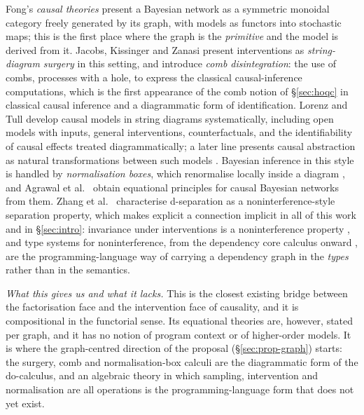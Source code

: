 Fong's \emph{causal theories} \cite{fong2012causaltheories} present a Bayesian network as a symmetric monoidal category freely generated by its graph, with models as functors into stochastic maps; this is the first place where the graph is the \emph{primitive} and the model is derived from it. Jacobs, Kissinger and Zanasi \cite{jacobs2019causal} present interventions as \emph{string-diagram surgery} in this setting, and introduce \emph{comb disintegration}: the use of combs, processes with a hole, to express the classical causal-inference computations, which is the first appearance of the comb notion of \S\ref{sec:hoqc} in classical causal inference and a diagrammatic form of identification. Lorenz and Tull \cite{lorenz2023causalmodelsstringdiagrams} develop causal models in string diagrams systematically, including open models with inputs, general interventions, counterfactuals, and the identifiability of causal effects treated diagrammatically; a later line presents causal abstraction as natural transformations between such models \cite{lorenztull2026abstraction,englberger2025causalabstractionscategoricallyunified}. Bayesian inference in this style is handled by \emph{normalisation boxes}, which renormalise locally inside a diagram \cite{jacobsszelesstein2025inference}, and Agrawal et al.\ \cite{agrawal2026equational} obtain equational principles for causal Bayesian networks from them. Zhang et al.\ \cite{zhang2026semanticseparation} characterise d-separation as a noninterference-style separation property, which makes explicit a connection implicit in all of this work and in \S\ref{sec:intro}: invariance under interventions is a noninterference property \cite{goguen1982noninterference}, and type systems for noninterference, from the dependency core calculus onward \cite{abadi1999dcc}, are the programming-language way of carrying a dependency graph in the \emph{types} rather than in the semantics.

\emph{What this gives us and what it lacks.} This is the closest existing bridge between the factorisation face and the intervention face of causality, and it is compositional in the functorial sense. Its equational theories are, however, stated per graph, and it has no notion of program context or of higher-order models. It is where the graph-centred direction of the proposal (\S\ref{sec:prop-graph}) starts: the surgery, comb and normalisation-box calculi are the diagrammatic form of the do-calculus, and an algebraic theory in which sampling, intervention and normalisation are all operations is the programming-language form that does not yet exist.

